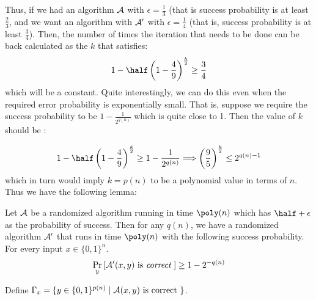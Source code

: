 \noindent Thus, if we had an algorithm ${\cal{A}}$ with $\epsilon = \frac{1}{3}$ (that is success probability is at least $\frac{2}{3}$, and we want an algorithm with ${\cal{A'}}$ with $\epsilon = \frac{1}{4}$ (that is, success probability is at least $\frac{3}{4}$). Then, the number of times the iteration that needs to be done can be back calculated as the $k$ that satisfies:
$$1-\half\left(1-\frac{4}{9}\right)^{\frac{k}{2}} \ge \frac{3}{4}$$
which will be a constant. Quite interestingly, we can do this even when the required error probability is exponentially small. That is, suppose we require the success probability to be $1-\frac{1}{2^{q(n)}}$ which is quite close to 1. Then the value of $k$ should be :

$$1-\half\left(1-\frac{4}{9}\right)^{\frac{k}{2}} \ge 1-\frac{1}{2^{q(n)}} \Longrightarrow
\left(\frac{9}{5}\right)^{\frac{k}{2}}\le 2^{q(n)-1}$$
which in turn would imply $k = p(n)$ to be a polynomial value in terms of $n$.
Thus we have the following lemma:

\begin{lemma}
\label{lem:amplification}
Let ${\cal{A}}$ be a randomized algorithm running in time $\poly(n)$ which has $\half+\epsilon$ as the probability of success. Then for any $q(n)$, we have a randomized algorithm ${\cal{A'}}$ that runs in time $\poly(n)$ with the following success probability. For every input $x \in \{0,1\}^{n}$.
\[ \Pr_{y} \left[ {\cal{A'}}(x,y) \text{ is {\em correct} } \right] \geq 1-2^{-q(n)} \]
\end{lemma}

Define $\Gamma_x = \{ y \in \{0,1\}^{p(n)}\mid {\cal{A}}(x,y) \textrm{ is correct }\}$.\\[-2mm]

